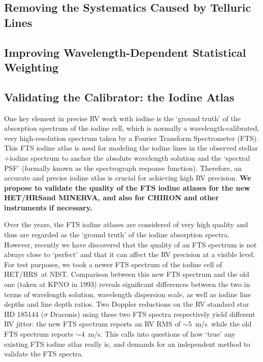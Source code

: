 \documentclass[12pt]{article}
\def\mps{m/s}
\def\minerva{MINERVA}
\def\hrs{HET/HRS}
\begin{document}
\vspace{-3pt}
\subsection{Removing the Systematics Caused by Telluric
  Lines}\label{sec:tell}


\vspace{-3pt}
\subsection{Improving Wavelength-Dependent Statistical Weighting}\label{sec:vanking}


\vspace{-3pt}
\subsection{Validating the Calibrator: the Iodine Atlas}\label{sec:fts}

One key element in precise RV work with iodine is the `ground truth'
of the absorption spectrum of the iodine cell, which is normally a
wavelength-calibrated, very high-resolution spectrum taken by a
Fourier Transform Spectrometer (FTS). This FTS iodine atlas is used
for modeling the iodine lines in the observed stellar$+$iodine
spectrum to anchor the absolute wavelength solution and the `spectral
PSF' (formally known as the spectrograph response
function). Therefore, an accurate and precise iodine atlas is crucial
for achieving high RV precision. \textbf{We propose to validate the
  quality of the FTS iodine atlases for the new \hrs and \minerva, and
  also for CHIRON and other instruments if necessary.}

Over the years, the FTS iodine atlases are considered of very high
quality and thus are regarded as the `ground truth' of the iodine
absorption spectra. However, recently we have discovered that the
quality of an FTS spectrum is not always close to `perfect' and that
it can affect the RV precision at a visible level. For test purposes,
we took a newer FTS spectrum of the iodine cell of \hrs\ at
NIST. Comparison between this new FTS spectrum and the old one (taken
at KPNO in 1993) reveals significant differences between the two in
terms of wavelength solution, wavelength dispersion scale, as well as
iodine line depths and line depth ratios. Two Doppler reductions on
the RV standard star HD 185144 ($\sigma$ Draconis) using these two FTS
spectra respectively yield different RV jitter: the new FTS spectrum
reports an RV RMS of $\sim5$~\mps\ while the old FTS spectrum reports
$\sim4$~\mps. This calls into questions of how `true' any existing FTS
iodine atlas really is, and demands for an independent method to
validate the FTS spectra.
\end{document}
